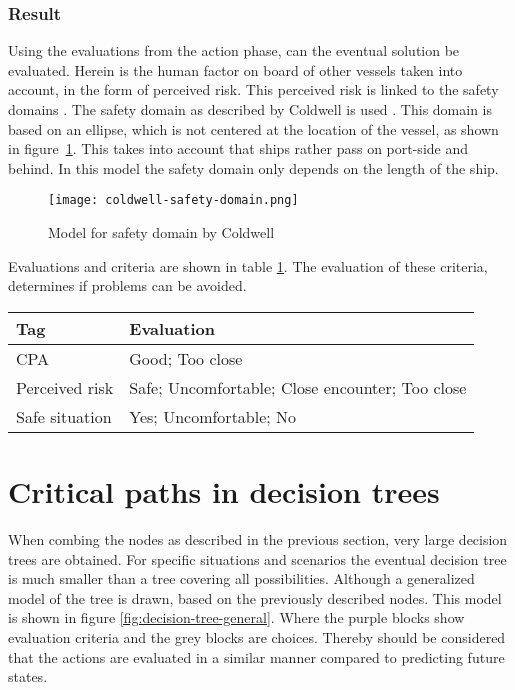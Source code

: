 \subsubsection{Result}
Using the evaluations from the action phase, can the eventual solution be evaluated. Herein is the human factor on board of other vessels taken into account, in the form of perceived risk. This perceived risk is linked to the safety domains \cite{Szlapczynski2017a}. The safety domain as described by Coldwell is used \cite{Coldwell1983}. This domain is based on an ellipse, which is not centered at the location of the vessel, as shown in figure~\ref{fig:coldwell-safety-domain}. This takes into account that ships rather pass on port-side and behind. In this model the safety domain only depends on the length of the ship.

\begin{figure}[p]
	\centering
	\texttt{[image: coldwell-safety-domain.png]}
	\caption{Model for safety domain by Coldwell}
	\label{fig:coldwell-safety-domain}
\end{figure}

Evaluations and criteria are shown in table \ref{tab:criteria-safe-situation}. The evaluation of these criteria, determines if problems can be avoided.

\begin{table}[H]
	\begin{tabular}{p{}|p{}}
		\toprule
		Tag & Evaluation\\
		\midrule
		CPA & Good; Too close\\
		Perceived risk & Safe; Uncomfortable; Close encounter; Too close\\
		Safe situation & Yes; Uncomfortable; No\\
		\bottomrule
	\end{tabular}
	
	\label{tab:criteria-safe-situation}
\end{table}


\section{Critical paths in decision trees}
When combing the nodes as described in the previous section, very large decision trees are obtained. For specific situations and scenarios the eventual decision tree is much smaller than a tree covering all possibilities. Although a generalized model of the tree is drawn, based on the previously described nodes. This model is shown in figure \ref{fig:decision-tree-general}. Where the purple blocks show evaluation criteria and the grey blocks are choices. Thereby should be considered that the actions are evaluated in a similar manner compared to predicting future states.

